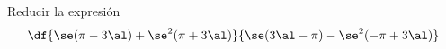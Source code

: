 Reducir la expresión
\[ \df{\se (\pi-3\al)+\se^2 (\pi +3\al)}{\se (3\al -\pi )-\se ^2 (-\pi +3 \al)} \]
